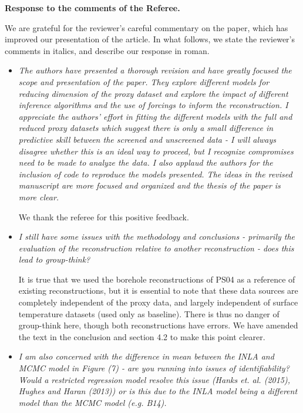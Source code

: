 \documentclass[11pt]{article}
\begin{document}
\begin{center}
  {\Large \textbf{Response to the comments of the Referee.}}
\end{center}

We are grateful for the reviewer's careful commentary on the paper, which has improved
our presentation of the article. In what follows, we state the reviewer's
comments in italics, and describe our response in roman.

\begin{itemize}
  
\item \textit{The authors have presented a thorough revision and have greatly
    focused the scope and presentation of the paper. They explore different
    models for reducing dimension of the proxy dataset and explore the impact of
    different inference algorithms and the use of forcings to inform the
    reconstruction. I appreciate the authors’ effort in fitting the different
    models with the full and reduced proxy datasets which suggest there is only
    a small difference in predictive skill between the screened and unscreened
    data - I will always disagree whether this is an ideal way to proceed, but I
    recognize compromises need to be made to analyze the data. I also applaud
    the authors for the inclusion of code to reproduce the models presented. The
    ideas in the revised manuscript are more focused and organized and the thesis of the paper is more clear.
}

We thank the referee for this positive feedback. 
\item \textit{I still have some issues with the methodology and conclusions -
    primarily the evaluation of the reconstruction relative to another
    reconstruction - does this lead to group-think?}

It is true that we used the borehole reconstructions of PS04 as a reference of existing reconstructions, but it is essential to note that these data sources are completely independent of the proxy data, and largely independent of surface temperature datasets (used only as baseline). There is thus no danger of group-think here, though both reconstructions have errors. We have amended the text in the conclusion and section 4.2 to make this point clearer.


  
\item \textit{I am also concerned with the
    difference in mean between the INLA and MCMC model in Figure (7) - are you
    running into issues of identifiability? Would a restricted regression model
    resolve this issue (Hanks et. al. (2015), Hughes and Haran (2013)) or is
    this due to the INLA model being a different model than the MCMC model (e.g.
    B14).}


\end{itemize}
\end{document}
